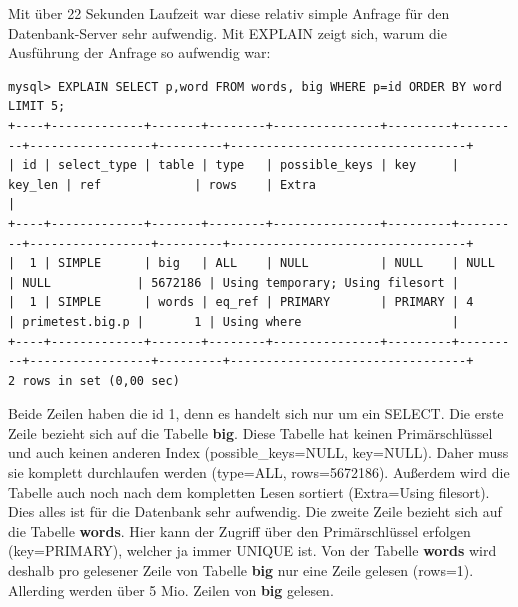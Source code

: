 Mit über 22 Sekunden Laufzeit war diese relativ simple Anfrage für den Datenbank-Server sehr aufwendig.
Mit EXPLAIN zeigt sich, warum die Ausführung der Anfrage so aufwendig war:
\begin{lstlisting}[basicstyle=\ttfamily\tiny]
mysql> EXPLAIN SELECT p,word FROM words, big WHERE p=id ORDER BY word LIMIT 5;
+----+-------------+-------+--------+---------------+---------+---------+-----------------+---------+---------------------------------+
| id | select_type | table | type   | possible_keys | key     | key_len | ref             | rows    | Extra                           |
+----+-------------+-------+--------+---------------+---------+---------+-----------------+---------+---------------------------------+
|  1 | SIMPLE      | big   | ALL    | NULL          | NULL    | NULL    | NULL            | 5672186 | Using temporary; Using filesort |
|  1 | SIMPLE      | words | eq_ref | PRIMARY       | PRIMARY | 4       | primetest.big.p |       1 | Using where                     |
+----+-------------+-------+--------+---------------+---------+---------+-----------------+---------+---------------------------------+
2 rows in set (0,00 sec)
\end{lstlisting}
Beide Zeilen haben die id 1, denn es handelt sich nur um ein SELECT. Die erste Zeile bezieht sich auf die Tabelle \textbf{big}. Diese Tabelle hat keinen Primärschlüssel und auch keinen anderen Index (possible\_keys=NULL, key=NULL). Daher muss sie komplett durchlaufen werden (type=ALL, rows=5672186). Außerdem wird die Tabelle auch noch nach dem kompletten Lesen sortiert (Extra=Using filesort). Dies alles ist für die Datenbank sehr aufwendig. Die zweite Zeile bezieht sich auf die Tabelle \textbf{words}. Hier kann der Zugriff über den Primärschlüssel erfolgen (key=PRIMARY), welcher ja immer UNIQUE ist. Von der Tabelle \textbf{words} wird deshalb pro gelesener Zeile von Tabelle \textbf{big} nur eine Zeile gelesen (rows=1). Allerding werden über 5 Mio. Zeilen von \textbf{big} gelesen.

